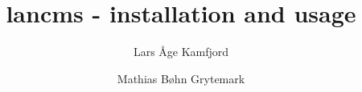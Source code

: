 \titlepage
\title{lancms - installation and usage}
\author{Lars Åge Kamfjord \and Mathias Bøhn Grytemark}
\maketitle


